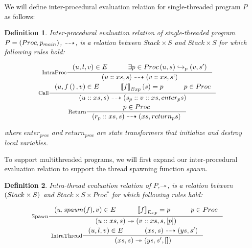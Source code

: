 \documentclass[..thesis.tex]{subfiles}
\newtheorem{defin}{Definition}[section]
\begin{document}
We will define inter-procedural evaluation relation for single-threaded program $P$ as follows:

\begin{defin}

Inter-procedural evaluation relation of single-threaded program $P = \left( Proc,p_{ main} \right) $, 
$\dashrightarrow$, is a relation between $Stack \times S$ and $Stack \times S$ for which following rules hold:

\addtolength{\jot}{2em}
\begin{gather*}
  \inference[IntraProc]{\lp u, l, v \rp \in E  \separ \exists p \in Proc  \lp u, s \rp \intraproc_p \lp v, s' \rp }{ \lp u :: xs, s \rp \interproc \lp v :: xs, s` \rp} \\
  \inference[Call]{ \lp u, f\lp\rp , v \rp  \in E \separ  \lllb f \rrrb_{Exp} \lp s \rp = p \separ p \in Proc }{\lp u :: xs , s \rp \interproc \lp s_{p} :: v :: xs, enter_{p} s \rp} \\
  \inference[Return] { p \in Proc} { \lp r_{p}::xs , s \rp \interproc \lp xs, return_{p} s \rp}
\end{gather*}
\addtolength{\jot}{-2em}

where $enter_{proc}$ and $return_{proc}$ are state transformers that initialize and destroy local variables.
\end{defin}


To support multithreaded programs, we will first expand our inter-procedural evaluation relation to support the thread spawning function $spawn$.

\begin{defin}

  Intra-thread evaluation relation of $P$,$\twoheadrightarrow$,
  is a relation between $\left( Stack \times S \right)$ and $Stack \times S \times Proc^\ast$ for which following rules hold:

  \addtolength{\jot}{2em}
  \begin{gather*}
    \inference[Spawn]{\lp u, spawn(f), v \rp \in E  \separ  \lllb f \rrrb_{Exp} = p \separ p \in Proc  }{ \lp u :: xs, s \rp \intrathread \lp v :: xs, s, \lbk p \rbk \rp} \\
    \inference[IntraThread] {\lp u, l , v \rp \in E \separ \lp xs , s \rp \interproc \lp ys, s' \rp }{ \lp xs , s \rp \intrathread \lp ys, s', \lbk \rbk \rp}
  \end{gather*}
  \addtolength{\jot}{-2em}

\end{defin}
\end{document}
